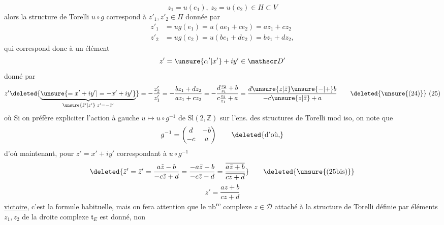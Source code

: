 \[
 z_1=u(e_1),\ z_2=u(e_2)\in H\subset V
\]
alors la structure de Torelli $u\circ g$ correspond à $z'_1,z'_2\in\Pi$ donnée par
\[
 \begin{aligned}
 z'_1&=ug(e_1)=u(ae_1+ce_2)=az_1+cz_2\\
 z'_2&=ug(e_2)=u(be_1+de_2)=bz_1+dz_2,
 \end{aligned}
\]
qui correspond donc à un élément
\[
 z'=\unsure{\alpha'|x'}+iy'\in\mathscr D'
\]
donné par
\[
 z'\deleted{\underbrace{\unsure{=x'+iy'|=-x'+iy'}}_{\unsure{\tilde z'|z'}\; z'=-\bar z'}}
 =-\frac{z'_2}{z'_1}=-\frac{bz_1+dz_2}{az_1+cz_2}
 =-\frac{d\frac{z_2}{z_1}+b}{c\frac{z_2}{z_1}+a}
 =\frac{d\unsure{z|\bar z}\unsure{-|+}b}{-c\unsure{z|\bar z}+a}
 \tag*{\deleted{\unsure{(24)}} (25)}
\]
où  Si on  préfère expliciter l'action à gauche $u\longmapsto u\circ g^{-1}$ de $\mathrm{Sl}(2,\mathbb Z)$ sur l'ens. des structures de Torelli mod iso, on note que
\[
 g^{-1}=\begin{pmatrix}d&-b\\-c&a\end{pmatrix}\qquad \text{\deleted{d'où,}}
\]
d'où maintenant, pour $z'=x'+iy'$ correspondant à $u\circ g^{-1}$
\[
 \deleted{\tilde z'=\bar z'=\frac{a\tilde z-b}{-c\tilde z+d}
 =\frac{-a\bar z-b}{-c\bar z-d}
 =\frac{\overline{a\bar z+b}}{\overline{c\bar z+d}}} \tag*{\deleted{\unsure{(25bis)}}}
\]
\[
 z'=\frac{az+b}{cz+d} \tag*{(25bis)}
\]
\uline{victoire}, c'est la formule habituelle, mais on fera attention que le nb\textsuperscript{re} complexe $z\in\mathscr D$ attaché à la structure de Torelli définie par  éléments $z_1,z_2$ de la droite complexe  $\mathfrak t_E$ est donné, non
